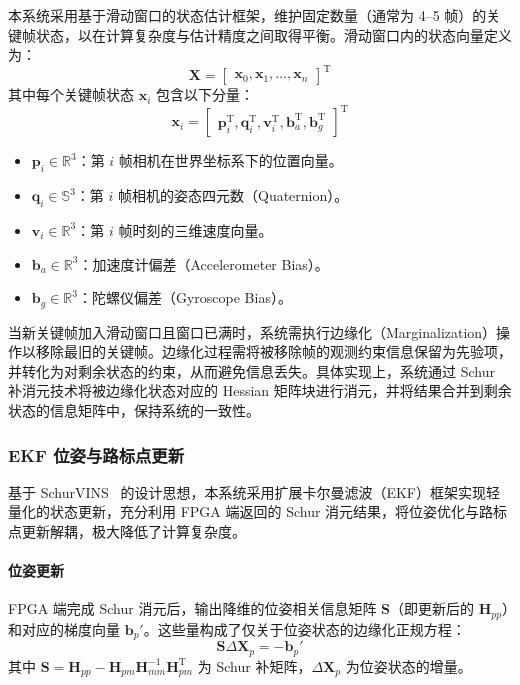 本系统采用基于滑动窗口的状态估计框架，维护固定数量（通常为 4--5 帧）的关键帧状态，以在计算复杂度与估计精度之间取得平衡。滑动窗口内的状态向量定义为：
\begin{equation}
    \mathbf{X} = \begin{bmatrix} \mathbf{x}_0, \mathbf{x}_1, \dots, \mathbf{x}_n \end{bmatrix}^{\mathrm{T}}
\end{equation}
其中每个关键帧状态 $\mathbf{x}_i$ 包含以下分量：
\begin{equation}
    \mathbf{x}_i = \begin{bmatrix} \mathbf{p}_i^{\mathrm{T}}, \mathbf{q}_i^{\mathrm{T}}, \mathbf{v}_i^{\mathrm{T}}, \mathbf{b}_a^{\mathrm{T}}, \mathbf{b}_g^{\mathrm{T}} \end{bmatrix}^{\mathrm{T}}
\end{equation}
\begin{itemize}
    \item $\mathbf{p}_i \in \mathbb{R}^3$：第 $i$ 帧相机在世界坐标系下的位置向量。
    \item $\mathbf{q}_i \in \mathbb{S}^3$：第 $i$ 帧相机的姿态四元数（Quaternion）。
    \item $\mathbf{v}_i \in \mathbb{R}^3$：第 $i$ 帧时刻的三维速度向量。
    \item $\mathbf{b}_a \in \mathbb{R}^3$：加速度计偏差（Accelerometer Bias）。
    \item $\mathbf{b}_g \in \mathbb{R}^3$：陀螺仪偏差（Gyroscope Bias）。
\end{itemize}

当新关键帧加入滑动窗口且窗口已满时，系统需执行边缘化（Marginalization）操作以移除最旧的关键帧。边缘化过程需将被移除帧的观测约束信息保留为先验项，并转化为对剩余状态的约束，从而避免信息丢失。具体实现上，系统通过 Schur 补消元技术将被边缘化状态对应的 Hessian 矩阵块进行消元，并将结果合并到剩余状态的信息矩阵中，保持系统的一致性。

\subsubsection{EKF 位姿与路标点更新}

基于 SchurVINS~\cite{fan2024schurvins} 的设计思想，本系统采用扩展卡尔曼滤波（EKF）框架实现轻量化的状态更新，充分利用 FPGA 端返回的 Schur 消元结果，将位姿优化与路标点更新解耦，极大降低了计算复杂度。

\paragraph{位姿更新}
FPGA 端完成 Schur 消元后，输出降维的位姿相关信息矩阵 $\mathbf{S}$（即更新后的 $\mathbf{H}_{pp}$）和对应的梯度向量 $\mathbf{b}_p'$。这些量构成了仅关于位姿状态的边缘化正规方程：
\begin{equation}
    \mathbf{S} \Delta \mathbf{X}_p = -\mathbf{b}_p'
\end{equation}
其中 $\mathbf{S} = \mathbf{H}_{pp} - \mathbf{H}_{pm}\mathbf{H}_{mm}^{-1}\mathbf{H}_{pm}^{\mathrm{T}}$ 为 Schur 补矩阵，$\Delta \mathbf{X}_p$ 为位姿状态的增量。

